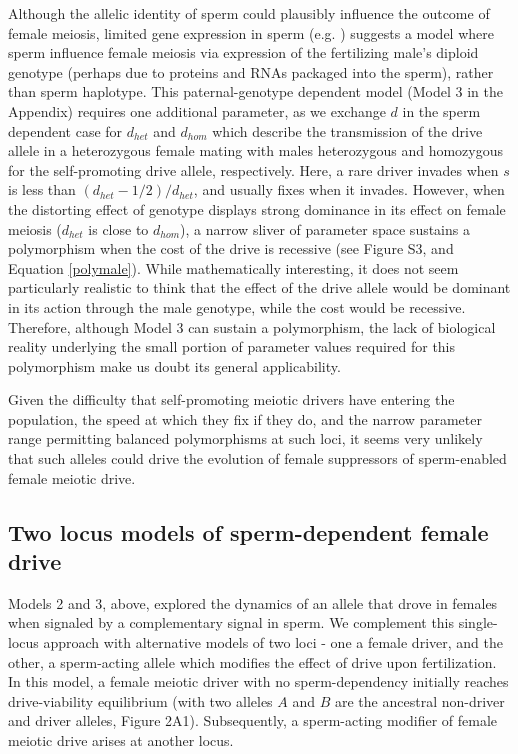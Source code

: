 \documentclass{pnastwo}
\begin{document}
\begin{article}
Although the allelic identity of sperm could plausibly influence the outcome of female meiosis, 
	limited gene expression in sperm (e.g. \cite{Joseph2004}) 
	suggests a model where sperm influence female meiosis via expression of the fertilizing male's
	diploid genotype (perhaps due to proteins and RNAs packaged into the sperm), rather than sperm haplotype.
This paternal-genotype dependent model (Model 3  in the Appendix) requires one additional parameter, as we exchange $d$ in the sperm dependent case for $d_{het}$ and $d_{hom}$ which describe the transmission of the drive allele in a heterozygous female mating with males heterozygous and homozygous for the self-promoting drive allele, respectively.  
Here, a rare driver invades when $s$ is less than $(d_{het}-1/2)/d_{het}$, and usually fixes when it invades.
However, when the distorting effect of genotype displays strong dominance in its
	effect on female meiosis ($d_{het}$ is close to $d_{hom}$), 
	a narrow sliver of parameter space sustains a polymorphism
	when the cost of the drive is recessive
	(see Figure S3, and Equation \ref{polymale}).  
While mathematically interesting, it does not seem particularly realistic to think that the
	effect of the drive allele would be dominant in its action through the
	male genotype, while the cost would be recessive. 
Therefore, although Model 3 can sustain a polymorphism, 
	the lack of biological reality underlying the small portion of parameter values 
	required for this polymorphism make us doubt its general applicability. 


Given the difficulty that self-promoting meiotic drivers have entering the population, the speed at
which they fix if they do, and the narrow parameter range permitting balanced polymorphisms at such loci,  
it seems very unlikely that such alleles could drive the evolution of female suppressors of sperm-enabled
female meiotic drive.

\subsection{Two locus models of sperm-dependent female drive}
Models 2 and 3, above, explored the dynamics of an allele that drove in females when signaled by a complementary signal in sperm.   
We complement this single-locus approach 
	with alternative models of two loci - one a female driver, 
	and the other, a sperm-acting allele which modifies the effect of drive upon fertilization. 
In this model, a female meiotic driver with no sperm-dependency 
	initially reaches drive-viability equilibrium (with two alleles
	$A$ and $B$ are the ancestral non-driver and driver alleles, Figure 2A1). 
Subsequently, a sperm-acting modifier of female meiotic drive arises at another locus. 


\end{article}
\end{document}
